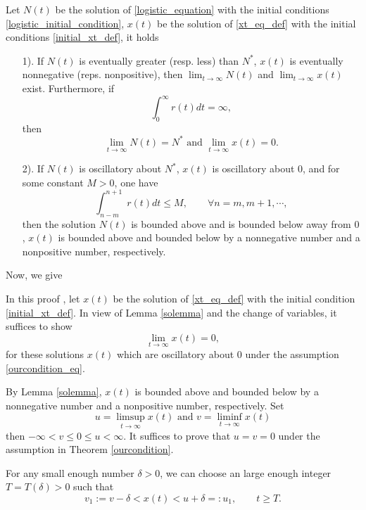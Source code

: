 \documentclass{HZNUMCM}
\begin{document}
\begin{lemma}\label{solemma}
Let $N(t)$ be the solution of \eqref{logistic_equation} with the initial conditions \eqref{logistic_initial_condition}, $x(t)$ be the solution of \eqref{xt_eq_def} with the initial conditions \eqref{initial_xt_def}, it holds
\begin{enumerate}
\item[1).] If $N(t)$ is eventually greater (resp. less) than $N^*$, $x(t)$ is eventually nonnegative (reps. nonpositive), then  $\lim_{t\rightarrow\infty}N(t)$ and  $\lim_{t\rightarrow\infty}x(t)$ exist. Furthermore, if
$$
\int_0^\infty r(t)dt=\infty,
$$ then $$\lim_{t\rightarrow\infty}N(t)=N^*\text{~and~}\lim_{t\rightarrow\infty}x(t)=0.$$
\item[2).]If $N(t)$ is oscillatory about $N^*$, $x(t)$ is oscillatory about $0$, and for some constant $M>0$, one have
\begin{equation}
\int_{n-m}^{n+1}r(t)dt\leqslant M,\qquad \forall n=m,m+1,\cdots,
\end{equation}
then the solution $N(t)$  is bounded above and is bounded below away from $0$, $x(t)$ is bounded above and bounded below by a nonnegative number and a nonpositive number, respectively.
\end{enumerate}
\end{lemma}

Now, we give

  In this proof , let $x(t)$ be the solution of \eqref{xt_eq_def} with the initial condition \eqref{initial_xt_def}. In view of Lemma \ref{solemma} and the change of variables,  it suffices to show
$$
\lim_{t\rightarrow\infty}x(t)=0,
$$
for these solutions $x(t)$ which are oscillatory about $0$ under the assumption \eqref{ourcondition_eq}.

By Lemma \ref{solemma}, $x(t)$ is bounded above and bounded below by a nonnegative number and a nonpositive number, respectively. Set
\begin{equation}\label{uv}
u=\limsup_{t\rightarrow \infty} x(t) \text{~and~}v=\liminf_{t\rightarrow \infty} x(t)
\end{equation}
then $-\infty<v\leqslant 0\leqslant u<\infty$. It suffices to prove that $u=v=0$ under the assumption in Theorem \ref{ourcondition}.

 For any small enough number $\delta>0$, we can choose an large enough integer $T=T(\delta)>0$ such that
\begin{equation}\label{u1v1}
v_1:=v-\delta<x(t)<u+\delta=:u_1,\qquad t\geqslant T.
\end{equation}
\end{document}
